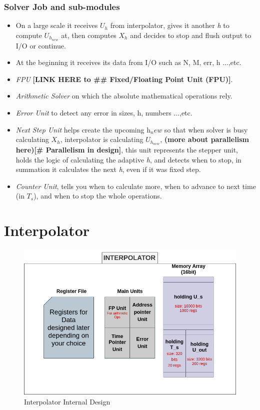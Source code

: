 \documentclass[12pt]{report}
\begin{document}
\subsubsection{Solver Job and sub-modules}
\begin{itemize}
    \item On a large scale it receives $U_h$ from interpolator, gives it another \emph{h} to compute $U_{h_{new}}$ at, then computes $X_h$ and decides to stop and flush output to I/O or continue.
    \item At the beginning it receives its data from I/O such as N, M, err, h ...,etc.
    \item \emph{FPU} \textbf{[LINK HERE to \#\# Fixed/Floating Point Unit (FPU)]}. %
    \item \emph{Arithmetic Solver} on which the absolute mathematical operations rely.
    \item \emph{Error Unit} to detect any error in sizes, h, numbers ...,etc.
    \item \emph{Next Step Unit} helps create the upcoming h$_new$ so that when solver is busy calculating $X_h$, interpolator is calculating $U_{h_{new}}$, \textbf{(more about parallelism here)[\# Parallelism in design]}, this unit represents the stepper unit, holds the logic of calculating the adaptive \emph{h}, and detects when to stop, in summation it calculates the next \emph{h}, even if it was fixed step.
    \item \emph{Counter Unit}, tells you when to calculate more, when to advance to next time (in $T_s$), and when to stop the whole operations.
\end{itemize}

\section{Interpolator}

\begin{figure}[hp]
    \centering
    \includegraphics[width=\textwidth]{interpolator}
    \caption{Interpolator Internal Design}
    \label{fig:interpolator}
\end{figure}
\end{document}
